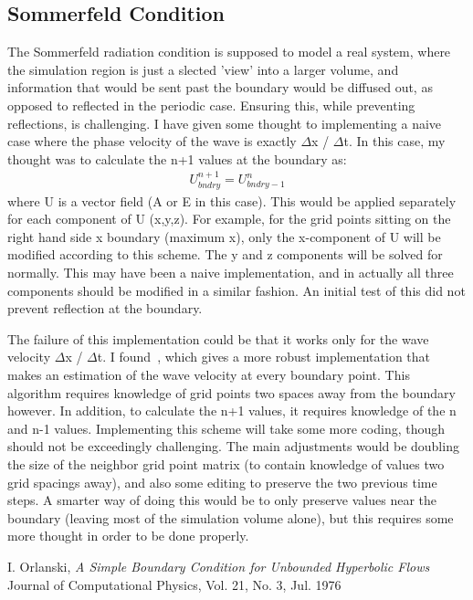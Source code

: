 \documentclass[a4paper]{article}
\begin{document}
\subsection{Sommerfeld Condition} 
The Sommerfeld radiation condition is supposed to model a real system, where
the simulation region is just a slected 'view' into a larger volume, and 
information that would be sent past the boundary would be diffused out, as 
opposed to reflected in the periodic case. Ensuring this, while preventing 
reflections, is challenging. I have given some thought to implementing a naive
case where the phase velocity of the wave is exactly $\Delta$x / $\Delta$t. 
In this case, my thought was to calculate the n+1 values at the boundary as:
\begin{align}
U^{n+1}_{bndry} = U^{n}_{bndry-1}
\end{align} 
where U is a vector field (A or E in this case). This would be applied separately
for each component of U (x,y,z). For example, for the grid points sitting on the
right hand side x boundary (maximum x), only the x-component of U will be modified
according to this scheme. The y and z components will be solved for normally. 
This may have been a naive implementation, and in actually all three components 
should be modified in a similar fashion. An initial test of this did not 
prevent reflection at the boundary.

The failure of this implementation could be that it works only for the wave
velocity $\Delta$x / $\Delta$t. I found~\cite{orlanski}, which gives
a more robust implementation that makes an estimation of the wave velocity
at every boundary point. This algorithm requires knowledge of grid points
two spaces away from the boundary however. In addition, to calculate the n+1
values, it requires knowledge of the n and n-1 values. Implementing this scheme
will take some more coding, though should not be exceedingly challenging. The
main adjustments would be doubling the size of the neighbor grid point matrix
(to contain knowledge of values two grid spacings away), and also some editing
to preserve the two previous time steps. A smarter way of doing this would be
to only preserve values near the boundary (leaving most of the simulation volume
alone), but this requires some more thought in order to be done properly.

\begin{thebibliography}{9}

  I. Orlanski,
  \textit{A Simple Boundary Condition for Unbounded Hyperbolic Flows}
  Journal of Computational Physics,
  Vol. 21, No. 3,
  Jul. 1976

\end{thebibliography}
\end{document}

